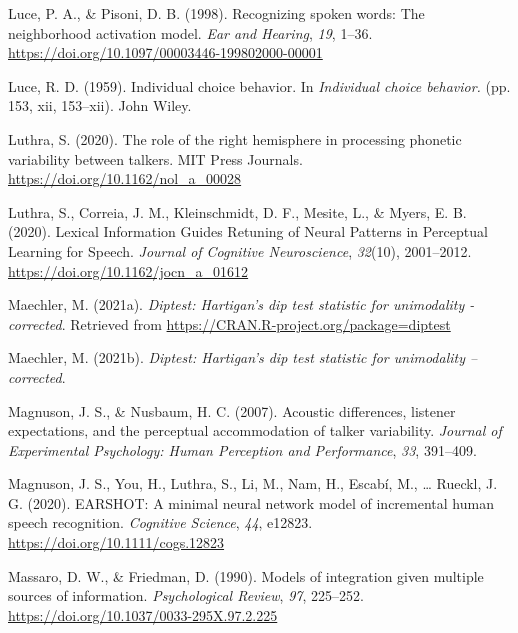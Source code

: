 \documentclass[
  11pt,
  man,floatsintext]{apa6}
\newlength{\cslhangindent}
\newlength{\cslentryspacingunit} %
\newenvironment{CSLReferences}[2] %
 {%
  \setlength{\parindent}{0pt}
  \ifodd #1
  \let\oldpar\par
  \def\par{\hangindent=\cslhangindent\oldpar}
  \fi
  \setlength{\parskip}{#2\cslentryspacingunit}
 }%
 {}
\begin{document}
\begin{CSLReferences}{1}{0}
\leavevmode{}%
Luce, P. A., \& Pisoni, D. B. (1998). Recognizing spoken words: The neighborhood activation model. \emph{Ear and Hearing}, \emph{19}, 1--36. \url{https://doi.org/10.1097/00003446-199802000-00001}

\leavevmode{}%
Luce, R. D. (1959). Individual choice behavior. In \emph{Individual choice behavior.} (pp. 153, xii, 153--xii). John Wiley.

\leavevmode{}%
Luthra, S. (2020). The role of the right hemisphere in processing phonetic variability between talkers. MIT Press Journals. \url{https://doi.org/10.1162/nol_a_00028}

\leavevmode{}%
Luthra, S., Correia, J. M., Kleinschmidt, D. F., Mesite, L., \& Myers, E. B. (2020). {Lexical Information Guides Retuning of Neural Patterns in Perceptual Learning for Speech}. \emph{Journal of Cognitive Neuroscience}, \emph{32}(10), 2001--2012. \url{https://doi.org/10.1162/jocn_a_01612}

\leavevmode{}%
Maechler, M. (2021a). \emph{Diptest: Hartigan's dip test statistic for unimodality - corrected}. Retrieved from \url{https://CRAN.R-project.org/package=diptest}

\leavevmode{}%
Maechler, M. (2021b). \emph{Diptest: Hartigan's dip test statistic for unimodality -- corrected}.

\leavevmode{}%
Magnuson, J. S., \& Nusbaum, H. C. (2007). Acoustic differences, listener expectations, and the perceptual accommodation of talker variability. \emph{Journal of Experimental Psychology: Human Perception and Performance}, \emph{33}, 391--409.

\leavevmode{}%
Magnuson, J. S., You, H., Luthra, S., Li, M., Nam, H., Escabí, M., \ldots{} Rueckl, J. G. (2020). EARSHOT: A minimal neural network model of incremental human speech recognition. \emph{Cognitive Science}, \emph{44}, e12823. \url{https://doi.org/10.1111/cogs.12823}

\leavevmode{}%
Massaro, D. W., \& Friedman, D. (1990). Models of integration given multiple sources of information. \emph{Psychological Review}, \emph{97}, 225--252. \url{https://doi.org/10.1037/0033-295X.97.2.225}


\end{CSLReferences}
\end{document}
